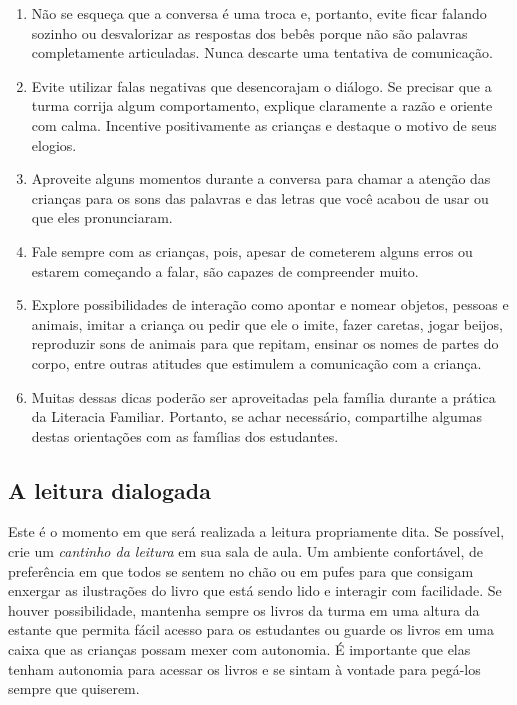 \documentclass[11pt]{extarticle}
\begin{document}
{{\begin{enumerate}
\item Não se esqueça que a conversa é uma troca e, portanto, 
evite ficar falando sozinho ou desvalorizar as respostas dos 
bebês porque não são palavras completamente articuladas. 
Nunca descarte uma tentativa de comunicação. 

\item Evite utilizar falas negativas que desencorajam o diálogo. 
Se precisar que a turma corrija algum comportamento, explique 
claramente a razão e oriente com calma. Incentive positivamente 
as crianças e destaque o motivo de seus elogios. 

\item Aproveite alguns momentos durante a conversa para chamar 
a atenção das crianças para os sons das palavras e das letras que você 
acabou de usar ou que eles pronunciaram.  

\item Fale sempre com as crianças, pois, apesar de cometerem alguns erros
ou estarem começando a falar, são capazes de compreender muito.

\item Explore possibilidades de interação como apontar e 
nomear objetos, pessoas e animais, imitar a criança ou pedir que 
ele o imite, fazer caretas, jogar beijos, reproduzir sons de 
animais para que repitam, ensinar os nomes de partes do corpo, 
entre outras atitudes que estimulem a comunicação com a criança. 

\item Muitas dessas dicas poderão ser aproveitadas pela 
família durante a prática da Literacia Familiar. Portanto, 
se achar necessário, compartilhe algumas destas orientações 
com as famílias dos estudantes.
\end{enumerate}


\subsection{A leitura dialogada}
Este é o momento em que será realizada a leitura propriamente dita. 
Se possível, crie um \textit{cantinho da leitura} em sua sala de aula. Um 
ambiente confortável, de preferência em que todos se sentem no chão ou 
em pufes para que consigam enxergar as ilustrações do livro que está 
sendo lido e interagir com facilidade. Se houver possibilidade, mantenha 
sempre os livros da turma em uma altura da estante que permita fácil 
acesso para os estudantes ou guarde os livros em uma caixa que as crianças 
possam mexer com autonomia. É importante que elas tenham autonomia para 
acessar os livros e se sintam à vontade para pegá-los sempre que quiserem. 

}}
\end{document}
